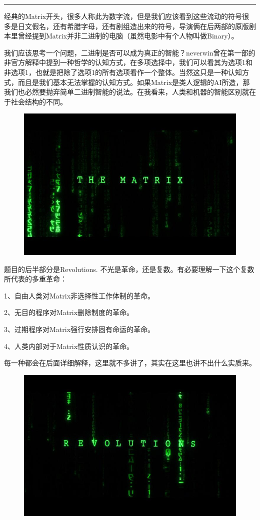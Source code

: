 \documentclass[UTF8]{ctexart}
\newcommand{\myparsep}{\noindent \rule[0.5ex]{\linewidth}{1pt}}
\begin{document}
\myparsep

经典的Matrix开头，很多人称此为数字流，但是我们应该看到这些流动的符号很多是日文假名，还有希腊字母，还有剧组造出来的符号，导演俩在后两部的原版剧本里曾经提到Matrix并非二进制的电脑（虽然电影中有个人物叫做Binary）。

我们应该思考一个问题，二进制是否可以成为真正的智能？neverwin曾在第一部的非官方解释中提到一种哲学的认知方式，在多项选择中，我们可以看其为选项1和非选项1，也就是把除了选项1的所有选项看作一个整体。当然这只是一种认知方式，而且是我们基本无法掌握的认知方式。如果Matrix是类人逻辑的AI所造，那我们也必然要抛弃简单二进制智能的说法。在我看来，人类和机器的智能区别就在于社会结构的不同。

\begin{figure}[htb]
\centering
\includegraphics[width=0.5\linewidth]{fig/eeeb9f515ea2062442a75b17.jpg}
\end{figure}

题目的后半部分是Revolutions. 不光是革命，还是复数。有必要理解一下这个复数所代表的多重革命：

1、自由人类对Matrix非选择性工作体制的革命。

2、无目的程序对Matrix删除制度的革命。

3、过期程序对Matrix强行安排固有命运的革命。

4、人类内部对于Matrix性质认识的革命。

每一种都会在后面详细解释，这里就不多讲了，其实在这里也讲不出什么实质来。

\begin{figure}[htb]
\centering
\includegraphics[width=0.5\linewidth]{fig/0b330eb35d354ba7d9335a17.jpg}
\end{figure}
\end{document}
